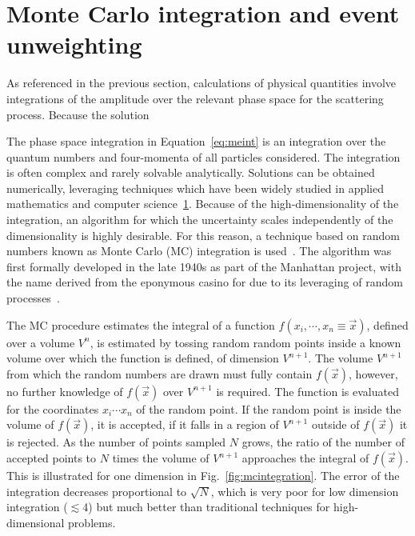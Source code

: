 \section{Monte Carlo integration and event unweighting}

As referenced in the previous section, calculations of physical
quantities involve integrations of the amplitude over the relevant phase space
for the scattering process. Because the solution


The phase space integration in Equation~\ref{eq:meint}
is an integration over the quantum numbers and four-momenta of all particles 
considered. The integration is often complex and rarely solvable analytically.
Solutions can be obtained numerically, leveraging techniques which have
been widely studied in applied mathematics and computer science~\ref{}.
Because of the high-dimensionality of the integration, an algorithm 
for which the uncertainty scales independently of the dimensionality is highly 
desirable. For this reason, a technique based on random numbers known as 
Monte Carlo (MC) integration is used~\cite{doi:10.1002/wics.1314}. The algorithm
was first formally developed in the late 1940s as part of the Manhattan project,
with the name derived from the eponymous casino for due to its leveraging
of random processes~\cite{10.2307/2280232}.

The MC procedure estimates 
the integral of a function $f(x_{i},\cdots,x_n\equiv\vec{x})$, defined over a volume $V^{n}$,
is estimated by tossing random random points inside a known volume
over which the function is defined, of dimension $V^{n+1}$. The volume $V^{n+1}$
from which the random numbers are drawn must fully contain 
$f(\vec{x})$, however, no further knowledge of $f(\vec{x})$ over $V^{n+1}$ is required. The function
is evaluated for the coordinates $x_i\cdots x_n$ of the random point.
If the random point is inside the volume of $f(\vec{x})$, it is accepted,
if it falls in a region of $V^{n+1}$ outside of $f(\vec{x})$ it is rejected.
As the number of points sampled $N$ grows, the ratio of the number of accepted
points to $N$ times the volume of $V^{n+1}$ approaches the integral of $f(\vec{x})$.
This is illustrated for one dimension in Fig.~\ref{fig:mcintegration}.
The error of the integration decreases proportional to $\sqrt{N}$, which
is very poor for low dimension integration ($\lesssim$4) but much better than
traditional techniques for high-dimensional problems.


